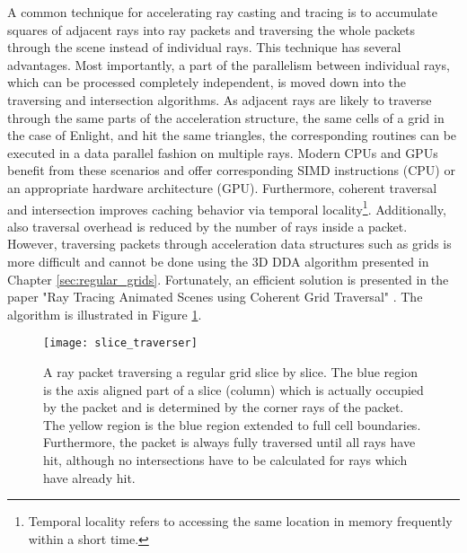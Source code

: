 A common technique for accelerating ray casting and tracing is to accumulate squares of adjacent rays into ray packets and traversing the whole packets through the scene instead of individual rays. This technique has several advantages. Most importantly, a part of the parallelism between individual rays, which can be processed completely independent, is moved down into the traversing and intersection algorithms. As adjacent rays are likely to traverse through the same parts of the acceleration structure, the same cells of a grid in the case of Enlight, and hit the same triangles, the corresponding routines can be executed in a data parallel fashion on multiple rays. Modern CPUs and GPUs benefit from these scenarios and offer corresponding SIMD instructions (CPU) or an appropriate hardware architecture (GPU). Furthermore, coherent traversal and intersection improves caching behavior via temporal locality\footnote{Temporal locality refers to accessing the same location in memory frequently within a short time.}. Additionally, also traversal overhead is reduced by the number of rays inside a packet. However, traversing packets through acceleration data structures such as grids is more difficult and cannot be done using the 3D DDA algorithm presented in Chapter \ref{sec:regular_grids}. Fortunately, an efficient solution is presented in the paper "Ray Tracing Animated Scenes using Coherent Grid Traversal" \cite{packet_caster}. The algorithm is illustrated in Figure \ref{fig:slice_traverser}.

\begin{figure}
\centering
\texttt{[image: slice\_traverser]}
\caption{A ray packet traversing a regular grid slice by slice. The blue region is the axis aligned part of a slice (column) which is actually occupied by the packet and is determined by the corner rays of the packet. The yellow region is the blue region extended to full cell boundaries. Furthermore, the packet is always fully traversed until all rays have hit, although no intersections have to be calculated for rays which have already hit.}
\label{fig:slice_traverser} 
\end{figure}


